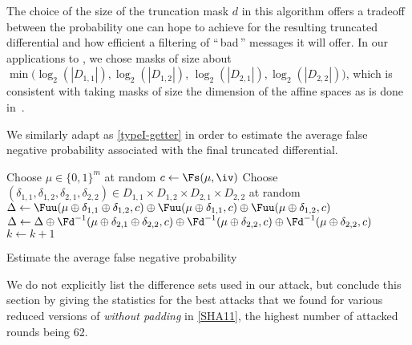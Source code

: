   The choice of the size of the truncation mask $d$ in this algorithm
  offers a tradeoff between the probability one can hope to achieve for the resulting truncated differential
  and how efficient a filtering of ``\,bad\,'' messages it will offer.
  In our applications to \shaone, we chose masks of size about
  $\min(\log_2(|D_{1,1}|), \log_2(|D_{1,2}|)$, $\log_2(|D_{2,1}|), \log_2(|D_{2,2}|))$,
  which is consistent with taking masks of size the dimension of the affine
  spaces as is done in~\cite{DBLP:conf/crypto/KnellwolfK12}.

  \medskip

  We similarly adapt \cite[Algorithm 3]{DBLP:conf/crypto/KnellwolfK12} as \autoref{typeI-getter} in order to estimate the average
  false negative probability associated with the final truncated differential.

  \begin{algorithm}[ht]
        \LinesNumbered

    {
      Choose $\mu \in \{0,1\}^m$ at random \;
      $c \leftarrow \Fs(\mu, \iv)$\;
      Choose $(\delta_{1,1},\delta_{1,2},\delta_{2,1},\delta_{2,2}) \in D_{1,1} \times D_{1,2} \times D_{2,1} \times D_{2,2} $ at random\; 
      $\Delta \leftarrow 
      \Fuu (\mu \oplus \delta_{1,1} \oplus \delta_{1,2} , c) \oplus 
      \Fuu (\mu \oplus \delta_{1,1} , c) \oplus 
      \Fuu(\mu \oplus \delta_{1,2},c)$\;
      $\Delta \leftarrow \Delta \oplus
      \Fd^{-1} (\mu \oplus \delta_{2,1} \oplus \delta_{2,2}, c) \oplus 
      \Fd^{-1}(\mu \oplus \delta_{2,2} , c) \oplus 
      \Fd^{-1} (\mu \oplus \delta_{2,2} , c) $\;
      {
        {
          $k \leftarrow k+1$\;
        }
      }
    }
    \caption{\label{typeI-getter}Estimate the average false negative probability}
  \end{algorithm}

\bigskip

  We do not explicitly list the difference sets used in our attack, but conclude this section by giving the statistics for the best attacks that we found for
  various reduced versions of \shaone \emph{without padding} in \autoref{SHA11}, the highest number of
  attacked rounds being 62.

